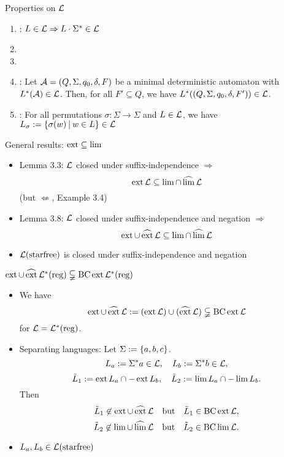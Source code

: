 \documentclass[
	handout,
	notheorems,noamsthm]{beamer}
\begin{document}
\begin{frame}[<+->]{Properties on $\mathcal{L}$}
\begin{enumerate}
\item {}: $L \in \mathcal{L} \Rightarrow L \cdot \Sigma^* \in \mathcal{L}$
\item {}
\item {}
\item {}:
Let $\mathcal{A} = (Q,\Sigma,q_0,\delta,F)$ be a minimal deterministic automaton with $L^*(\mathcal{A}) \in \mathcal{L}$. Then, for all $F' \subseteq Q$, we have $L^*((Q,\Sigma,q_0,\delta,F')) \in \mathcal{L}$.
\item {}: For all permutations $\sigma : \Sigma \rightarrow \Sigma$ and $L \in \mathcal{L}$, we have $L_\sigma := \Set{\sigma(w)}{w \in L} \in \Lang$
\end{enumerate}
\end{frame}

\begin{frame}[<+->]{General results: $\operatorname{ext} \subseteq \lim$}
\begin{itemize}
\item Lemma 3.3: $\mathcal{L}$ closed under suffix-independence $\Rightarrow$
\[ \operatorname{ext} \mathcal{L} \subseteq \lim \cap \operatorname{\widehat{lim}} \mathcal{L} \]
(but $\not\Leftarrow$, Example 3.4)
\item Lemma 3.8: $\mathcal{L}$ closed under suffix-independence and negation $\Rightarrow$
\[ \operatorname{ext} \cup \operatorname{\widehat{ext}} \mathcal{L} \subseteq \lim \cap \operatorname{\widehat{lim}} \mathcal{L} \]
\item $\mathcal{L}(\textup{\textrm{starfree}})$ is closed under suffix-independence and negation
\end{itemize}
\end{frame}

\begin{frame}[<+->]{$\operatorname{ext} \cup \operatorname{\widehat{ext}} \mathcal{L}^*(\textup{\textrm{reg}}) \subsetneqq \operatorname{BC} \operatorname{ext} \mathcal{L}^*(\textup{\textrm{reg}})$}
\begin{itemize}
\item
We have
\[ \operatorname{ext} \cup \operatorname{\widehat{ext}} \mathcal{L} := (\operatorname{ext} \mathcal{L}) \cup (\operatorname{\widehat{ext}} \mathcal{L}) \subsetneqq \operatorname{BC} \operatorname{ext} \mathcal{L} \]
for $\mathcal{L} = \mathcal{L}^*(\textup{\textrm{reg}})$.

\item
Separating languages: Let $\Sigma := \Set{a,b,c}$.
\[ L_a := \Sigma^* a \in \mathcal{L}, \ \ \ L_b := \Sigma^* b \in \mathcal{L}, \]
\[ \tilde L_1 := \ext L_a \cap -\ext L_b, \ \ \ \tilde L_2 := \lim L_a \cap -\lim L_b . \]
Then
\[ \tilde L_1 \not\in \ext \cup \dext \Lang \ \ \text{ but } \ \ \tilde L_1 \in \BC \ext \Lang , \]
\[ \tilde L_2 \not\in \lim \cup \dlim \Lang \ \ \text{ but } \ \ \tilde L_2 \in \BC \lim \Lang . \]

\item
$L_a,L_b \in \mathcal{L}(\textup{\textrm{starfree}})$
\end{itemize}
\end{frame}
\end{document}
